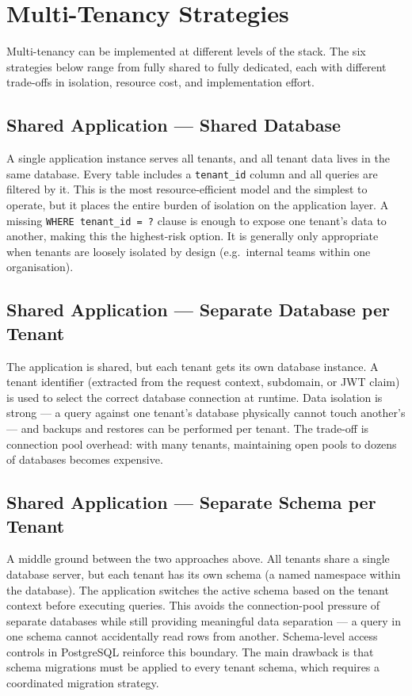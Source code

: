 \chapter{Multi-Tenancy Strategies}
\label{chapter:strategies}

Multi-tenancy can be implemented at different levels of the stack. The six strategies below range from fully shared to fully dedicated, each with different trade-offs in isolation, resource cost, and implementation effort.

\section{Shared Application --- Shared Database}

A single application instance serves all tenants, and all tenant data lives in the same database. Every table includes a \texttt{tenant\_id} column and all queries are filtered by it. This is the most resource-efficient model and the simplest to operate, but it places the entire burden of isolation on the application layer. A missing \texttt{WHERE tenant\_id = ?} clause is enough to expose one tenant's data to another, making this the highest-risk option. It is generally only appropriate when tenants are loosely isolated by design (e.g.\ internal teams within one organisation).

\section{Shared Application --- Separate Database per Tenant}

The application is shared, but each tenant gets its own database instance. A tenant identifier (extracted from the request context, subdomain, or JWT claim) is used to select the correct database connection at runtime. Data isolation is strong --- a query against one tenant's database physically cannot touch another's --- and backups and restores can be performed per tenant. The trade-off is connection pool overhead: with many tenants, maintaining open pools to dozens of databases becomes expensive.

\section{Shared Application --- Separate Schema per Tenant}

A middle ground between the two approaches above. All tenants share a single database server, but each tenant has its own schema (a named namespace within the database). The application switches the active schema based on the tenant context before executing queries. This avoids the connection-pool pressure of separate databases while still providing meaningful data separation --- a query in one schema cannot accidentally read rows from another. Schema-level access controls in PostgreSQL reinforce this boundary. The main drawback is that schema migrations must be applied to every tenant schema, which requires a coordinated migration strategy.

